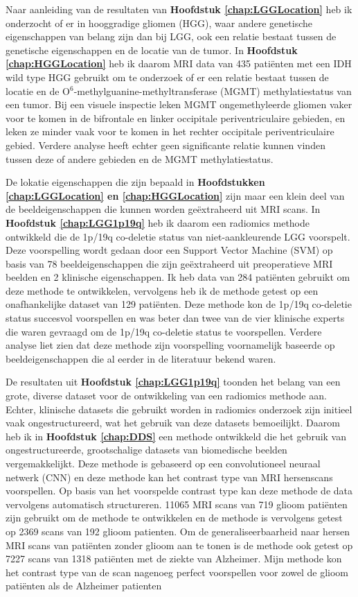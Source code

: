 Naar aanleiding van de resultaten van \textbf{Hoofdstuk \ref{chap:LGGLocation}} heb ik onderzocht of er in hooggradige gliomen (HGG), waar andere genetische eigenschappen van belang zijn dan bij LGG, ook een relatie bestaat tussen de genetische eigenschappen en de locatie van de tumor.
In \textbf{Hoofdstuk \ref{chap:HGGLocation}} heb ik daarom MRI data van 435 pati{\"e}nten met een IDH wild type HGG gebruikt om te onderzoek of er een relatie bestaat tussen de locatie en de O$^6$-methylguanine-methyltransferase (MGMT) methylatiestatus van een tumor.
Bij een visuele inspectie leken  MGMT ongemethyleerde gliomen vaker voor te komen in de bifrontale en linker occipitale periventriculaire gebieden, en leken ze minder vaak voor te komen in het rechter occipitale periventriculaire gebied.
Verdere analyse heeft echter geen significante relatie kunnen vinden tussen deze of andere gebieden en de MGMT methylatiestatus.

De lokatie eigenschappen die zijn bepaald in \textbf{Hoofdstukken \ref{chap:LGGLocation} en \ref{chap:HGGLocation}} zijn maar een klein deel van de beeldeigenschappen die kunnen worden ge{\"e}xtraheerd uit MRI scans.
In \textbf{Hoofdstuk \ref{chap:LGG1p19q}} heb ik daarom een radiomics methode ontwikkeld die de 1p/19q co-deletie status van niet-aankleurende LGG voorspelt.
Deze voorspelling wordt gedaan door een Support Vector Machine (SVM) op basis van 78 beeldeigenschappen die zijn ge{\"e}xtraheerd uit preoperatieve MRI beelden en 2 klinische eigenschappen.
Ik heb data van 284 pati{\"e}nten gebruikt om deze methode te ontwikkelen, vervolgens heb ik de methode getest op een onafhankelijke dataset van 129 pati{\"e}nten.
Deze methode kon de 1p/19q co-deletie status succesvol voorspellen en was beter dan twee van de vier klinische experts die waren gevraagd om de 1p/19q co-deletie status te voorspellen.
Verdere analyse liet zien dat deze methode zijn voorspelling voornamelijk baseerde op beeldeigenschappen die al eerder in de literatuur bekend waren.

De resultaten uit \textbf{Hoofdstuk \ref{chap:LGG1p19q}} toonden het belang van een grote, diverse dataset voor de ontwikkeling van een radiomics methode aan.
Echter, klinische datasets die gebruikt worden in radiomics onderzoek zijn initieel vaak ongestructureerd, wat het gebruik van deze datasets bemoeilijkt.
Daarom heb ik in \textbf{Hoofdstuk \ref{chap:DDS}} een methode ontwikkeld die het gebruik van ongestructureerde, grootschalige datasets van biomedische beelden vergemakkelijkt.
Deze methode is gebaseerd op een convolutioneel neuraal netwerk (CNN) en deze methode kan het contrast type van  MRI hersenscans voorspellen.
Op basis van het voorspelde contrast type kan deze methode de data vervolgens automatisch structureren.
11065 MRI scans van 719 glioom pati{\"e}nten zijn gebruikt om de methode te ontwikkelen en de methode is vervolgens getest op 2369 scans van 192 glioom patienten.
Om de generaliseerbaarheid naar hersen MRI scans van pati{\"e}nten zonder glioom aan te tonen is de methode ook getest op 7227 scans van 1318 pati{\"e}nten met de ziekte van Alzheimer.
Mijn methode kon het contrast type van de scan nagenoeg perfect voorspellen voor zowel de glioom pati{\"e}nten als de Alzheimer patienten

